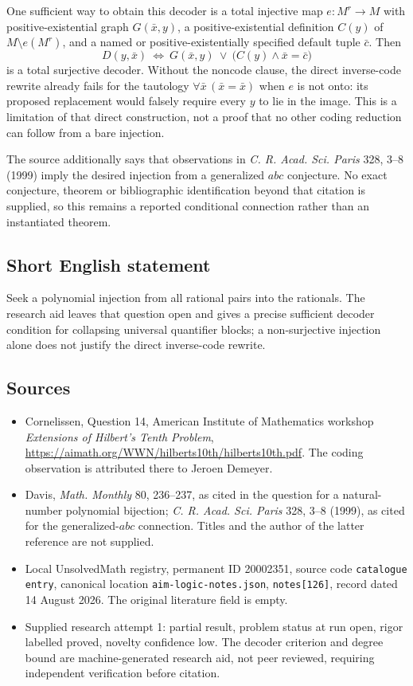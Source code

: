 \documentclass[11pt]{article}
\begin{document}
One sufficient way to obtain this decoder is a total injective map $e:M^r\to M$ with positive-existential graph $G(\bar x,y)$, a positive-existential definition $C(y)$ of $M\setminus e(M^r)$, and a named or positive-existentially specified default tuple $\bar c$. Then
\[
 D(y,\bar x)\ \Longleftrightarrow\
 G(\bar x,y)\ \vee\ \bigl(C(y)\wedge\bar x=\bar c\bigr)
\]
is a total surjective decoder. Without the noncode clause, the direct inverse-code rewrite already fails for the tautology $\forall\bar x\,(\bar x=\bar x)$ when $e$ is not onto: its proposed replacement would falsely require every $y$ to lie in the image. This is a limitation of that direct construction, not a proof that no other coding reduction can follow from a bare injection.

The source additionally says that observations in \emph{C. R. Acad. Sci. Paris} 328, 3--8 (1999) imply the desired injection from a generalized $abc$ conjecture. No exact conjecture, theorem or bibliographic identification beyond that citation is supplied, so this remains a reported conditional connection rather than an instantiated theorem.
\subsection{Short English statement}
Seek a polynomial injection from all rational pairs into the rationals. The research aid leaves that question open and gives a precise sufficient decoder condition for collapsing universal quantifier blocks; a non-surjective injection alone does not justify the direct inverse-code rewrite.
\subsection{Sources}
\begin{itemize}
\item Cornelissen, Question 14, American Institute of Mathematics workshop \emph{Extensions of Hilbert's Tenth Problem}, \url{https://aimath.org/WWN/hilberts10th/hilberts10th.pdf}. The coding observation is attributed there to Jeroen Demeyer.
\item Davis, \emph{Math. Monthly} 80, 236--237, as cited in the question for a natural-number polynomial bijection; \emph{C. R. Acad. Sci. Paris} 328, 3--8 (1999), as cited for the generalized-$abc$ connection. Titles and the author of the latter reference are not supplied.
\item Local UnsolvedMath registry, permanent ID 20002351, source code \texttt{catalogue entry}, canonical location \texttt{aim-logic-notes.json}, \texttt{notes[126]}, record dated 14 August 2026. The original literature field is empty.
\item Supplied research attempt 1: partial result, problem status at run open, rigor labelled proved, novelty confidence low. The decoder criterion and degree bound are machine-generated research aid, not peer reviewed, requiring independent verification before citation.
\end{itemize}
\end{document}
